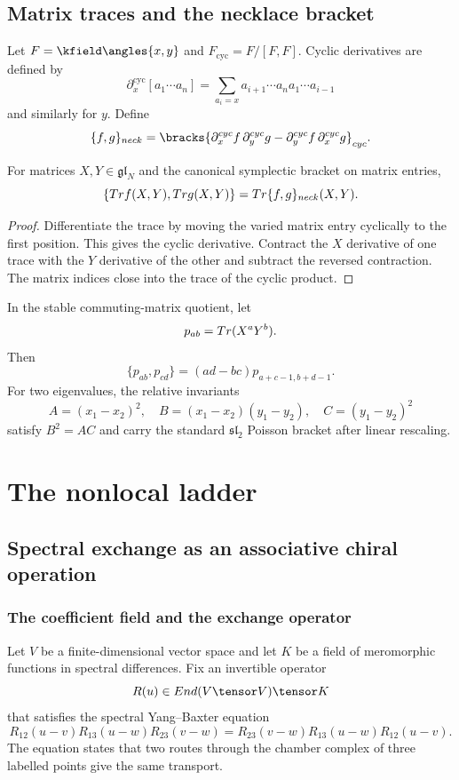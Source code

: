 \chapter{Matrix traces and the necklace bracket}
Let $F=\kfield\angles{x,y}$ and $F_{\mathrm{cyc}}=F/[F,F]$. Cyclic derivatives are defined by
\[
 \partial_x^{\mathrm{cyc}}[a_1\cdots a_n]
 =\sum_{a_i=x}a_{i+1}\cdots a_na_1\cdots a_{i-1}
\]
and similarly for $y$. Define
\[
 \{f,g\}_{\mathrm{neck}}
 =\bracks{
 \partial_x^{\mathrm{cyc}}f\,\partial_y^{\mathrm{cyc}}g
 -\partial_y^{\mathrm{cyc}}f\,\partial_x^{\mathrm{cyc}}g}_{\mathrm{cyc}}.
\]

\begin{theorem}
For matrices $X,Y\in\mathfrak{gl}_N$ and the canonical symplectic bracket on matrix entries,
\[
 \{Tr f(X,Y),Tr g(X,Y)\}
 =Tr\{f,g\}_{neck}(X,Y).
\]
\end{theorem}
\begin{proof}
Differentiate the trace by moving the varied matrix entry cyclically to the first position. This gives the cyclic derivative. Contract the $X$ derivative of one trace with the $Y$ derivative of the other and subtract the reversed contraction. The matrix indices close into the trace of the cyclic product.
\end{proof}

In the stable commuting-matrix quotient, let
\[
 p_{ab}=Tr(X^aY^b).
\]
Then
\[
 \{p_{ab},p_{cd}\}=(ad-bc)p_{a+c-1,b+d-1}.
\]
For two eigenvalues, the relative invariants
\[
 A=(x_1-x_2)^2,
 \quad B=(x_1-x_2)(y_1-y_2),
 \quad C=(y_1-y_2)^2
\]
satisfy $B^2=AC$ and carry the standard $\mathfrak{sl}_2$ Poisson bracket after linear rescaling.


\part{The nonlocal ladder}

\chapter{Spectral exchange as an associative chiral operation}
\section{The coefficient field and the exchange operator}
Let $V$ be a finite-dimensional vector space and let $K$ be a field of meromorphic functions in spectral differences.  Fix an invertible operator
\[
 R(u)\in\End(V\tensor V)\tensor K
\]
that satisfies the spectral Yang--Baxter equation
\begin{equation}\label{eq:vol1-spectral-ybe}
 R_{12}(u-v)R_{13}(u-w)R_{23}(v-w)
 =R_{23}(v-w)R_{13}(u-w)R_{12}(u-v).
\end{equation}
The equation states that two routes through the chamber complex of three labelled points give the same transport.

